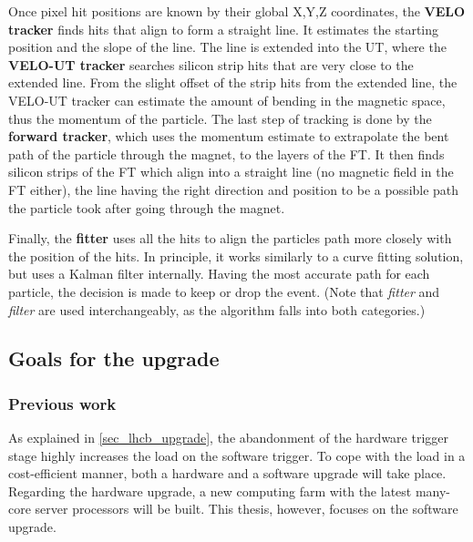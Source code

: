 \documentclass[12pt]{article}
\begin{document}
Once pixel hit positions are known by their global X,Y,Z coordinates, the \textbf{VELO tracker} finds hits that align to form a straight line. It estimates the starting position and the slope of the line. The line is extended into the UT, where the \textbf{VELO-UT tracker} searches silicon strip hits that are very close to the extended line. From the slight offset of the strip hits from the extended line, the VELO-UT tracker can estimate the amount of bending in the magnetic space, thus the momentum of the particle. The last step of tracking is done by the \textbf{forward tracker}, which uses the momentum estimate to extrapolate the bent path of the particle through the magnet, to the layers of the FT. It then finds silicon strips of the FT which align into a straight line (no magnetic field in the FT either), the line having the right direction and position to be a possible path the particle took after going through the magnet.

Finally, the \textbf{fitter} uses all the hits to align the particles path more closely with the position of the hits. In principle, it works similarly to a curve fitting solution, but uses a Kalman filter\cite{kalman_filter_wiki}\cite{kalman_filter_lhcb} internally. Having the most accurate path for each particle, the decision is made to keep or drop the event. (Note that \textit{fitter} and \textit{filter} are used interchangeably, as the algorithm falls into both categories.)


\subsection{Goals for the upgrade}

\subsubsection{Previous work}

As explained in \ref{sec_lhcb_upgrade}, the abandonment of the hardware trigger stage highly increases the load on the software trigger. To cope with the load in a cost-efficient manner, both a hardware and a software upgrade will take place. Regarding the hardware upgrade, a new computing farm with the latest many-core server processors will be built. This thesis, however, focuses on the software upgrade.
\end{document}
